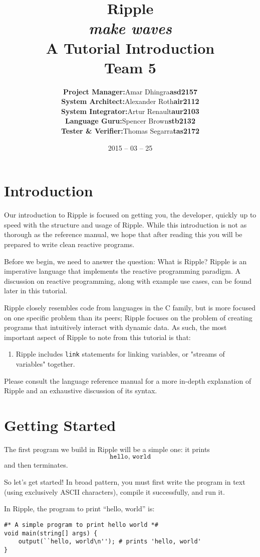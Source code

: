 \documentclass{article}
\title{\vspace{5cm}Ripple \\ {\large\it make waves} \\ A Tutorial Introduction \\ Team 5}
\author{\begin{tabular}{rcl}
\textbf{Project Manager:}    &   Amar Dhingra   &   \textbf{asd2157} \\
\textbf{System Architect:}   &   Alexander Roth &   \textbf{air2112} \\
\textbf{System Integrator:}  &   Artur Renault  &   \textbf{aur2103} \\
\textbf{Language Guru:}      &   Spencer Brown  &   \textbf{stb2132} \\
\textbf{Tester \& Verifier:} &   Thomas Segarra &   \textbf{tas2172}
\end{tabular}}
\date{2015 -- 03 -- 25}
\newcommand{\code}{\texttt}
\begin{document}
\maketitle
\newpage
\tableofcontents
\newpage

\section{Introduction}
Our introduction to Ripple is focused on getting you, the developer, quickly up to speed with the structure and usage of Ripple. While this introduction is not as thorough as the reference manual, we hope that after reading this you will be prepared to write clean reactive programs.

Before we begin, we need to answer the question: What is Ripple? Ripple is an imperative language that implements the reactive programming paradigm. A discussion on reactive programming, along with example use cases, can be found later in this tutorial.

Ripple closely resembles code from languages in the C family, but is more focused on one specific problem than its peers; Ripple focuses on the problem of creating programs that intuitively interact with dynamic data. As such, the most important aspect of Ripple to note from this tutorial is that:

\begin{enumerate}
\item Ripple includes \code{link} statements for linking variables, or "streams of variables" together.
\end{enumerate}

Please consult the language reference manual for a more in-depth explanation of Ripple and an exhaustive discussion of its syntax.

\section{Getting Started}
The first program we build in Ripple will be a simple one: it prints
\[ \code{hello, world} \] 
and then terminates.

So let's get started! In broad pattern, you must first write the program in text (using exclusively ASCII characters), compile it successfully, and run it.

In Ripple, the program to print ``hello, world'' is:
\begin{lstlisting}[title=\emph{hello.rpl}]
#* A simple program to print hello world *#
void main(string[] args) {
    output(``hello, world\n''); # prints 'hello, world'
}
\end{lstlisting}
\end{document}
